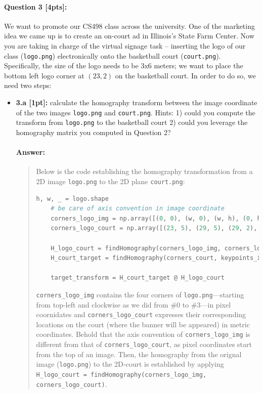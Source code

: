 \documentclass[11pt]{article}
\begin{document}
\paragraph{Question 3 [4pts]:}

We want to promote our CS498 class across the university. One of the marketing idea we came up is to create an on-court ad in Illinois's State Farm Center. Now you are taking in charge of the virtual signage task --  inserting the logo of our class (\texttt{logo.png}) electronically onto the basketball court (\texttt{court.png}). Specifically, the size of the logo needs to be 3x6 meters; we want to place the bottom left logo corner at $(23, 2)$ on the basketball court. In order to do so, we need two steps: 

\begin{itemize}
\item \textbf{3.a [1pt]:} calculate the homography transform between the image coordinate of the two images \texttt{logo.png} and \texttt{court.png}. Hints: 1) could you compute the transform from \texttt{logo.png} to the basketball court 2) could you leverage the homography matrix you computed in Question 2? 

\paragraph{Answer:} 
\begin{quote}
    Below is the code establishing the homography transformation from a 2D image \texttt{logo.png} to the 2D plane \texttt{court.png}:
    \begin{lstlisting}[language=Python]
    h, w, _ = logo.shape
    # be care of axis convention in image coordinate
    corners_logo_img = np.array([(0, 0), (w, 0), (w, h), (0, h)])
    corners_logo_court = np.array([(23, 5), (29, 5), (29, 2), (23, 2)])

    H_logo_court = findHomography(corners_logo_img, corners_logo_court)
    H_court_target = findHomography(corners_court, keypoints_im)

    target_transform = H_court_target @ H_logo_court
    \end{lstlisting}

    \verb|corners_logo_img| contains the four corners of \texttt{logo.png}---starting from top-left and clockwise as we did from \#0 to \#3---in pixel coornidates and \verb|corners_logo_court| expresses their corresponding locations on the court (where the banner will be appeared) in metric coordinates. Behold that the axis convention of \verb|corners_logo_img| is different from that of \verb|corners_logo_court|, as pixel coordinates start from the top of an image. Then, the homography from the orignal image (\texttt{logo.png}) to the 2D-court is established by applying \verb|H_logo_court = findHomography(corners_logo_img, corners_logo_court)|. 
    

\end{quote}
\end{itemize}
\end{document}
